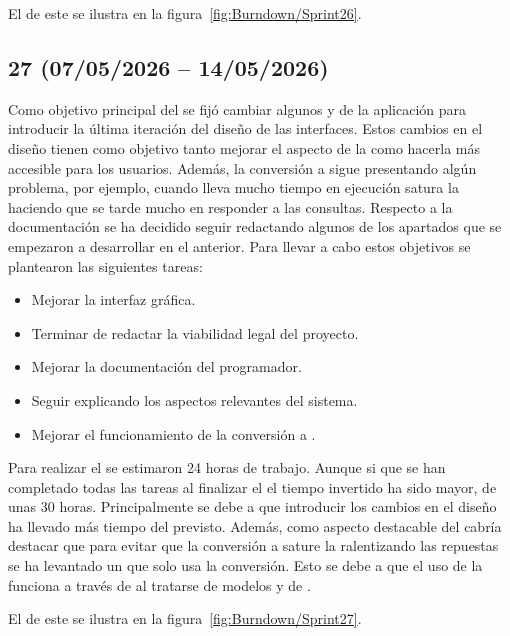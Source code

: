 El  de este  se ilustra en la figura~\ref{fig:Burndown/Sprint26}.

\subsection{ 27 (07/05/2026 -- 14/05/2026)}
Como objetivo principal del  se fijó cambiar algunos  y  de la aplicación para introducir la última iteración del diseño de las interfaces. Estos cambios en el diseño tienen como objetivo tanto mejorar el aspecto de la  como hacerla más accesible para los usuarios. Además, la conversión a  sigue presentando algún problema, por ejemplo, cuando lleva mucho tiempo en ejecución satura la  haciendo que se tarde mucho en responder a las consultas. Respecto a la documentación se ha decidido seguir redactando algunos de los apartados que se empezaron a desarrollar en el  anterior. Para llevar a cabo estos objetivos se plantearon las siguientes tareas:
\begin{itemize}
\tightlist
	\item Mejorar la interfaz gráfica.
	\item Terminar de redactar la viabilidad legal del proyecto.
	\item Mejorar la documentación del programador.
	\item Seguir explicando los aspectos relevantes del sistema.
	\item Mejorar el funcionamiento de la conversión a .
\end{itemize}

Para realizar el  se estimaron 24 horas de trabajo. Aunque si que se han completado todas las tareas al finalizar el  el tiempo invertido ha sido mayor, de unas 30 horas. Principalmente se debe a que introducir los cambios en el diseño ha llevado más tiempo del previsto. Además, como aspecto destacable del  cabría destacar que para evitar que la conversión a  sature la  ralentizando las repuestas se ha levantado un  que solo usa la conversión. Esto se debe a que el uso de la  funciona a través de  al tratarse de modelos  y de .

El  de este  se ilustra en la figura~\ref{fig:Burndown/Sprint27}.

